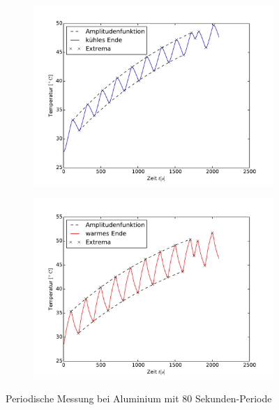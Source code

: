 \begin{figure}[htp]
\label{fig:M2Alu}
\centering
	\begin{subfigure}{0.9\textwidth}
	\centering
	\includegraphics[width=\textwidth]{Bilder/M2_Alu_kuehl.pdf}
	\end{subfigure}
	\begin{subfigure}{0.9\textwidth}
	\centering
	\includegraphics[width=\textwidth]{Bilder/M2_Alu_warm.pdf}
	\end{subfigure}
\caption{Periodische Messung bei Aluminium mit 80 Sekunden-Periode}
\end{figure}
